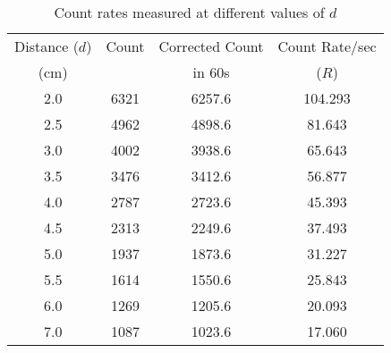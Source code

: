 \begin{table}[H]
    \centering
    \begin{tabular}{|c|c|c|c|}\hline
    Distance ($d$) & Count & Corrected Count & Count Rate/sec \\ 
    (cm) &  & in 60s &($R$) \\ \hline
    2.0 & 6321 & 6257.6 & 104.293 \\
    2.5 & 4962 & 4898.6 & 81.643 \\
    3.0 & 4002 & 3938.6 & 65.643 \\
    3.5 & 3476 & 3412.6 & 56.877 \\
    4.0 & 2787 & 2723.6 & 45.393 \\
    4.5 & 2313 & 2249.6 & 37.493 \\
    5.0 & 1937 & 1873.6 & 31.227 \\
    5.5 & 1614 & 1550.6 & 25.843 \\
    6.0 & 1269 & 1205.6 & 20.093 \\
    7.0 & 1087 & 1023.6 & 17.060 \\\hline
    \end{tabular}
    \caption{Count rates measured at different values of $d$}
    \label{t3}
\end{table}